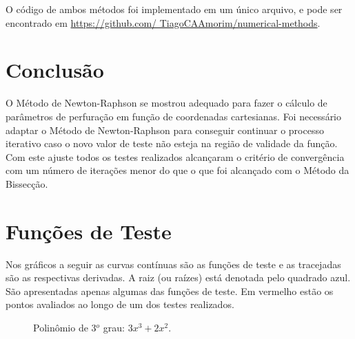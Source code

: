 \documentclass[final,5p]{elsarticle}
\numberwithin{equation}{section}
\begin{document}
    O código de ambos métodos foi implementado em um único arquivo, e pode ser encontrado em \href{https://github.com/TiagoCAAmorim/numerical-methods/blob/main/02_NewtonRaphson/02_newton_raphson.c}{https://github.com/ TiagoCAAmorim/numerical-methods}.

    \section{Conclusão}
    
    O Método de Newton-Raphson se mostrou adequado para fazer o cálculo de parâmetros de perfuração em função de coordenadas cartesianas. Foi necessário adaptar o Método de Newton-Raphson para conseguir continuar o processo iterativo caso o novo valor de teste não esteja na região de validade da função. Com este ajuste todos os testes realizados alcançaram o critério de convergência com um número de iterações menor do que o que foi alcançado com o Método da Bissecção.

    

\appendix

\section{Funções de Teste}

Nos gráficos a seguir as curvas contínuas são as funções de teste e as tracejadas são as respectivas derivadas. A raiz (ou raízes) está denotada pelo quadrado azul. São apresentadas apenas algumas das funções de teste. Em vermelho estão os pontos avaliados ao longo de um dos testes realizados.

\begin{figure}[hbt!] 
    \label{fig:polinomial}
    \centering
    \caption{Polinômio de 3$^o$ grau: $3x^3 + 2x^2$.}
\end{figure}
\end{document}
